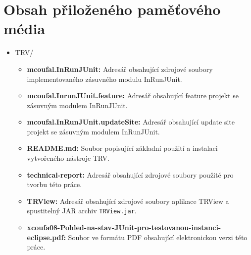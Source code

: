 \chapter{Obsah přiloženého paměťového média}
\label{jak}

\begin{itemize}
 \item {\LARGE TRV/}
    {\Large \begin{itemize}
     \item \textbf{mcoufal.InRunJUnit:}
	Adresář obsahující zdrojové soubory implementovaného zásuvného modulu InRunJUnit.
     \item \textbf{mcoufal.InrunJUnit.feature:}
	Adresář obsahující feature projekt se zásuvným modulem InRunJUnit.
     \item \textbf{mcoufal.InRunJUnit.updateSite:}
	Adresář obsahující update site projekt se zásuvným modulem InRunJUnit.
     \item \textbf{README.md:}
	Soubor popisující základní použití a instalaci vytvořeného nástroje TRV.
     \item \textbf{technical-report:}
	Adresář obsahující zdrojové soubory použité pro tvorbu této práce.
     \item \textbf{TRView:}
	Adresář obsahující zdrojové soubory aplikace TRView a spustitelný JAR archiv \texttt{TRView.jar}.
     \item \textbf{xcoufa08-Pohled-na-stav-JUnit-pro-testovanou-instanci-eclipse.pdf:}
	Soubor ve formátu PDF obsahující elektronickou verzi této práce.
    \end{itemize}}
\end{itemize}


